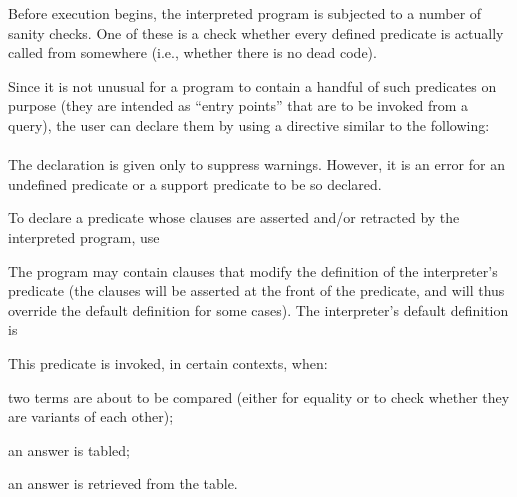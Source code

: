 
Before execution begins, the interpreted program is subjected to a number of
sanity checks.  One of these is a check whether every defined predicate is
actually called from somewhere (i.e., whether there is no dead code).

Since it is not unusual for a program to contain a handful of such predicates
on purpose (they are intended as ``entry points'' that are to be invoked from
a query),
the user can declare them by using a directive similar to the following:\\
\ind{}\label{dir:top}\\
The declaration is given only to suppress warnings.  However, it is an error
for an undefined predicate or a support predicate to be so declared.




To declare a predicate whose clauses are asserted and/or retracted by the
interpreted program, use\\
\ind{}\label{dir:dynamic}




The program may contain clauses that modify the definition of the
interpreter's predicate  (the clauses will be
asserted at the front of the predicate, and will thus override the default
definition for some cases).  The interpreter's default definition is\\
\ind{}

This predicate is invoked, in certain contexts, when:
\begin{LightItemize}
  \item
    two terms are about to be compared (either for equality or to check
    whether they are variants of each other);
  \item
    an answer is tabled;
  \item
    an answer is retrieved from the table.
\end{LightItemize}

